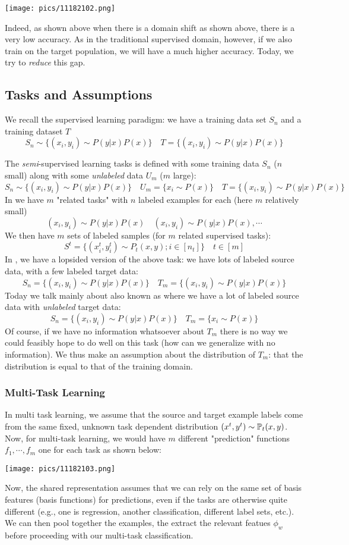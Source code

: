 \documentclass[11pt]{scrartcl}
\begin{document}
\begin{center}
    \texttt{[image: pics/11182102.png]}
\end{center}
Indeed, as shown above when there is a domain shift as shown above, there is a very low accuracy. As in the traditional supervised domain, however, if we also train on the target population, we will have a much higher accuracy. Today, we try to \textit{reduce} this gap.

\subsection{Tasks and Assumptions}
We recall the supervised learning paradigm: we have a training data set $S_n$ and a training dataset $T$ $$S_n \sim \{(x_i,y_i) \sim P(y|x)P(x)\} \quad T=\{(x_i,y_i) \sim P(y|x)P(x)\}$$

The \textit{semi}-supervised learning tasks is defined with some training data $S_n$ ($n$ small) along with some \textit{unlabeled} data $U_m$ ($m$ large): $$S_n \sim \{(x_i,y_i) \sim P(y|x)P(x)\} \quad U_m=\{x_i \sim P(x)\} \quad T=\{(x_i,y_i) \sim P(y|x)P(x)\}$$
In  we have $m$ "related tasks" with $n$ labeled examples for each (here $m$ relatively small) 
$$(x_i,y_i) \sim P(y|x)P(x) \quad (x_i,y_i) \sim P(y|x)P(x), \cdots$$
We then have $m$ sets of labeled samples (for $m$ related supervised tasks):
$$S^{t}=\{(x_i^t,y_i^t) \sim P_t(x,y); i \in [n_t]\} \quad t \in [m]$$
In , we have a lopsided version of the above task: we have lots of labeled source data, with a few labeled target data: 
$$S_n=\{(x_i,y_i) \sim P(y|x)P(x)\} \quad T_m=\{(x_i,y_i) \sim P(y|x)P(x)\}$$
Today we talk mainly about  also known as  where we have a lot of labeled source data with \textit{unlabeled} target data: 
$$S_n=\{(x_i,y_i) \sim P(y|x)P(x)\} \quad T_m=\{x_i \sim P(x)\}$$
Of course, if we have no information whatsoever about $T_m$ there is no way we could feasibly hope to do well on this task (how can we generalize with no information). We thus make an assumption about the distribution of $T_m$: that the distribution is equal to that of the training domain. 

\subsubsection{Multi-Task Learning}
In multi task learning, we assume that the source and target example labels come from the same fixed, unknown task dependent distribution $(x^t,y^t) \sim \mathbb{P}_t(x,y)$. Now, for multi-task learning, we would have $m$ different 
"prediction" functions $f_1,\cdots,f_m$ one for each task as shown below:
\begin{center}
    \texttt{[image: pics/11182103.png]}
\end{center}
Now, the shared representation assumes that we can rely on the same set of basis features (basis functions) for predictions, even if the tasks are otherwise quite different (e.g., one is regression, another classification, different label sets, etc.). We can then pool together the examples, the extract the relevant featues $\phi_w$ before proceeding with our multi-task classification. 
\end{document}
